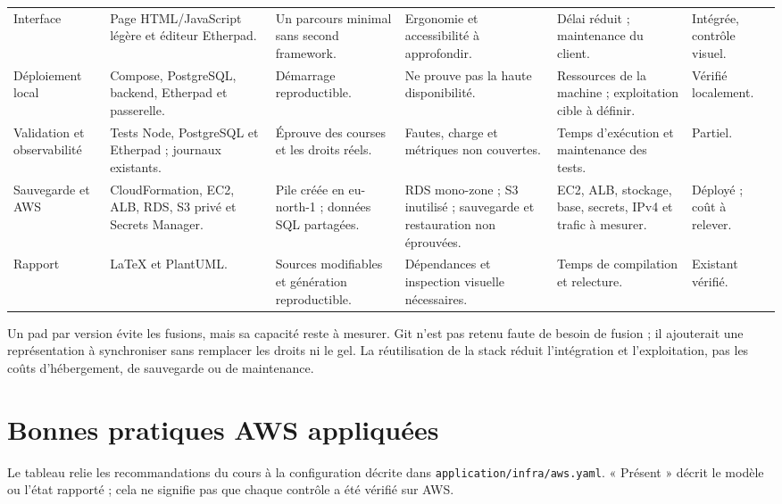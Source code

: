 \begin{longtable}{@{}L{21mm}@{\hspace{1mm}}L{28mm}@{\hspace{1mm}}L{29mm}@{\hspace{1mm}}L{27mm}@{\hspace{1mm}}L{24mm}@{\hspace{1mm}}L{17mm}@{}}
\addlinespace
Interface & Page HTML/JavaScript légère et éditeur Etherpad. & Un parcours minimal sans second framework. & Ergonomie et accessibilité à approfondir. & Délai réduit ; maintenance du client. & Intégrée, contrôle visuel. \\
\addlinespace
Déploiement local & Compose, PostgreSQL, backend, Etherpad et passerelle. & Démarrage reproductible. & Ne prouve pas la haute disponibilité. & Ressources de la machine ; exploitation cible à définir. & Vérifié localement. \\
\addlinespace
Validation et observabilité & Tests Node, PostgreSQL et Etherpad ; journaux existants. & Éprouve des courses et les droits réels. & Fautes, charge et métriques non couvertes. & Temps d'exécution et maintenance des tests. & Partiel. \\
\addlinespace
Sauvegarde et AWS & CloudFormation, EC2, ALB, RDS, S3 privé et Secrets Manager. & Pile créée en eu-north-1 ; données SQL partagées. & RDS mono-zone ; S3 inutilisé ; sauvegarde et restauration non éprouvées. & EC2, ALB, stockage, base, secrets, IPv4 et trafic à mesurer. & Déployé ; coût à relever. \\
\addlinespace
Rapport & LaTeX et PlantUML. & Sources modifiables et génération reproductible. & Dépendances et inspection visuelle nécessaires. & Temps de compilation et relecture. & Existant vérifié. \\
\bottomrule
\end{longtable}
\endgroup

Un pad par version évite les fusions, mais sa capacité reste à mesurer. Git n’est pas retenu faute de besoin de fusion ; il ajouterait une représentation à synchroniser sans remplacer les droits ni le gel. La réutilisation de la stack réduit l’intégration et l’exploitation, pas les coûts d’hébergement, de sauvegarde ou de maintenance.

\section{Bonnes pratiques AWS appliquées}

Le tableau relie les recommandations du cours à la configuration décrite dans \texttt{application/infra/aws.yaml}. « Présent » décrit le modèle ou l'état rapporté ; cela ne signifie pas que chaque contrôle a été vérifié sur AWS.


